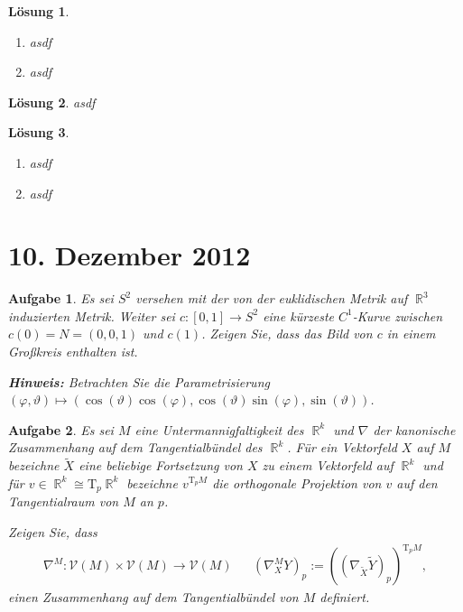 \documentclass[paper=A4, twoside, chapterprefix=true, bibliography=totoc, headsepline]{scrbook}
\let\temp\phi{}
\let\phi\varphi{}
\let\varphi\temp{}
\let\temp\theta{}
\let\theta\vartheta{}
\let\vartheta\temp{}
\let\temp\epsilon{}
\let\epsilon\varepsilon{}
\let\varepsilon\temp{}
\let\temp\rho{}
\let\rho\varrho{}
\let\varrho\temp{}
\DeclareMathOperator{\R}{\mathbb{R}}
\theoremstyle{plain}
\theoremstyle{nonumberplain}
\theoremstyle{empty}
\theoremstyle{break}
\newtheorem{Aufg}{Aufgabe}
\newtheorem{Loes}{L\"osung}
\begin{document}
\begin{Loes}\begin{enumerate}[label=\alph*),leftmargin=*,widest=b]
\item
	asdf
\item
	asdf
\end{enumerate}\end{Loes}

\begin{Loes}
asdf
\end{Loes}

\begin{Loes}\begin{enumerate}[label=\alph*),leftmargin=*,widest=b]
\item
	asdf
\item
	asdf
\end{enumerate}\end{Loes}


\section{10. Dezember 2012}
\setcounter{Aufg}{0} %
\setcounter{Loes}{0}

\begin{Aufg}
Es sei $S^2$ versehen mit der von der euklidischen Metrik auf $\R^3$ induzierten Metrik. Weiter sei $c:[0,1] \to S^2$ eine kürzeste $C^1$-Kurve zwischen $c(0)=N=(0,0,1)$ und $c(1)$. Zeigen Sie, dass das Bild von $c$ in einem Großkreis enthalten ist.

{\footnotesize \textbf{Hinweis:} Betrachten Sie die Parametrisierung $(\phi,\theta)\mapsto (\cos(\theta) \cos(\phi),\cos(\theta) \sin(\phi),\sin(\theta))$.}
\end{Aufg}

\begin{Aufg}
Es sei $M$ eine Untermannigfaltigkeit des $\R^k$ und $\nabla$ der kanonische Zusammenhang auf dem Tangentialbündel des $\R^k$. Für ein Vektorfeld $X$ auf $M$ bezeichne $\tilde{X}$ eine beliebige Fortsetzung von $X$ zu einem Vektorfeld auf $\R^k$ und für $v\in \R^k \cong \mathrm{T}_p\R^k$ bezeichne $v^{\mathrm{T}_pM}$ die orthogonale Projektion von $v$ auf den Tangentialraum von $M$ an $p$. 

Zeigen Sie, dass
\begin{align*}
	\nabla^M:\mathcal{V}(M) \times \mathcal{V}(M) \to \mathcal{V}(M) && (\nabla^M_X Y)_p:=((\nabla_{\tilde{X}} \tilde{Y})_p)^{\mathrm{T}_pM},
\end{align*}
einen Zusammenhang auf dem Tangentialbündel von $M$ definiert.
\end{Aufg}
\end{document}
